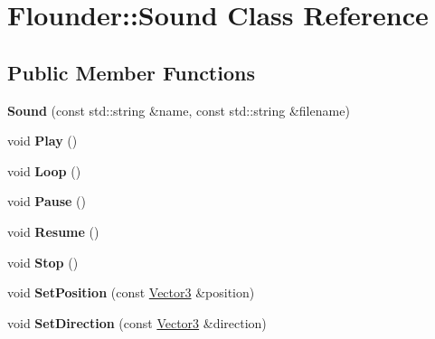 \hypertarget{class_flounder_1_1_sound}{}\section{Flounder\+:\+:Sound Class Reference}
\label{class_flounder_1_1_sound}
\subsection*{Public Member Functions}
\begin{DoxyCompactItemize}
\item 
\mbox{\label{class_flounder_1_1_sound_ab5be9a8b84b7f106a1261d68ac704daf}} 
{\bfseries Sound} (const std\+::string \&name, const std\+::string \&filename)
\item 
\mbox{\label{class_flounder_1_1_sound_aedde0985cf80695b664076ba1dba94a3}} 
void {\bfseries Play} ()
\item 
\mbox{\label{class_flounder_1_1_sound_ad972f4a5cb1f40ba25ea258378e03a02}} 
void {\bfseries Loop} ()
\item 
\mbox{\label{class_flounder_1_1_sound_a92b297c8c91fc83c3fff1f8e70e3c9f4}} 
void {\bfseries Pause} ()
\item 
\mbox{\label{class_flounder_1_1_sound_a13dba93583c11b4ab6da8f29e0bb39dc}} 
void {\bfseries Resume} ()
\item 
\mbox{\label{class_flounder_1_1_sound_a56d0ff6d6413d390104e8cb276309584}} 
void {\bfseries Stop} ()
\item 
\mbox{\label{class_flounder_1_1_sound_a91f97273b0eab98720d7c4408b18aeb6}} 
void {\bfseries Set\+Position} (const \hyperlink{class_flounder_1_1_vector3}{Vector3} \&position)
\item 
\mbox{\label{class_flounder_1_1_sound_ab55a823a7c9d7003061fbdd5ff37b50f}} 
void {\bfseries Set\+Direction} (const \hyperlink{class_flounder_1_1_vector3}{Vector3} \&direction)
\item 
\mbox{\label{class_flounder_1_1_sound_a2ca1bfa8b77c170c4b73544c943588a5}} 

\end{DoxyCompactItemize}
